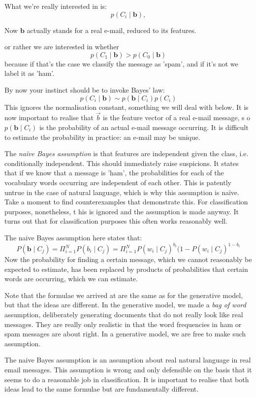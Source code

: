 What we're really interested in is:
$$
p(C_i \mid \boldsymbol{b}),
$$

Now $\boldsymbol{b}$ actually stands for a real e-mail, reduced to its features.

or rather we are interested in whether
$$
p(C_1 \mid \boldsymbol{b}) > p(C_0 \mid \boldsymbol{b})
$$ 
because if that's the case we classify the message as 'spam', and if it's not we label it as 'ham'.

By now your instinct should be to invoke Bayes' law:
$$
p(C_i \mid \boldsymbol{b} ) \sim p(\boldsymbol{b} \mid C_i) p(C_i)
$$
This ignores the normalisation constant, something we will deal with below. It is now important to realise that $\vec{b}$ is the feature vector of a real e-mail message, s
o $p(\boldsymbol{b} \mid C_i)$ is the probability of an actual e-mail message occurring. It is difficult to estimate the probability in practice: an e-mail may be unique.

The \emph{na\"ive Bayes assumption} is that features are independent given the class, i.e. conditionally independent. This should immediately raise suspicions.
It states that if we know that a message is 'ham', the probabilities for each of the vocabulary words occurring are independent of each other. This is patently untrue in the
case of natural language, which is why this assumption is na\"ive. Take a moment to find counterexamples that demonstrate this. For classification purposes, nonetheless, t
his is ignored and the assumption is made anyway. It turns out that for classification purposes this often works reasonably well.

The naive Bayes assumption here states that:
$$
P(\boldsymbol{b} \mid C_j) = \Pi^N_{i=1} P(b_i \mid C_j) = \Pi^N_{i=1} P(w_i \mid C_j)^{b_i}(1 - P(w_i \mid C_j)^{1 - b_i} 
$$
Now the probability for finding a certain message, which we cannot reasonably be expected to estimate, has been replaced by products of probabilities that certain words are
occurring, which we can estimate.

Note that the formulae we arrived at are the same as for the generative model, but that the ideas are different. In the generative model, we made a \emph{bag of word}
assumption, deliberately generating documents that do not really look like real messages. They are really only realistic in that the word frequencies in ham or
spam messages are about right. In a generative model, we are free to make such assumption.

The naive Bayes assumption is an assumption about real natural language in real email messages. This assumption is wrong and only defensible on the basis that it seems to do
a reasonable job in classification. It is important to realise that both ideas lead to the same formulae but are fundamentally different.


